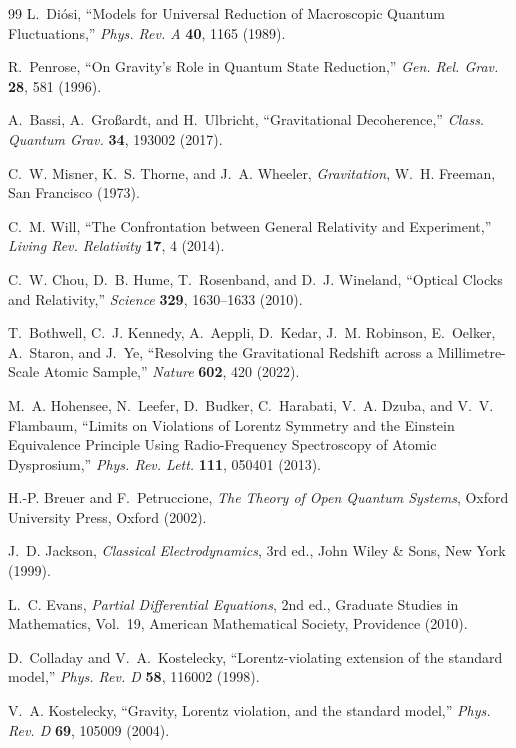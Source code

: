 \documentclass[a4paper,fleqn]{cas-dc}
\theoremstyle{thmstyleone}%
\theoremstyle{thmstyletwo}%
\begin{document}
\begin{thebibliography}{99}
L.~Di\'osi,
``Models for Universal Reduction of Macroscopic Quantum
Fluctuations,''
\textit{Phys. Rev. A} \textbf{40}, 1165 (1989).

R.~Penrose,
``On Gravity's Role in Quantum State Reduction,''
\textit{Gen. Rel. Grav.} \textbf{28}, 581 (1996).

A.~Bassi, A.~Gro{\ss}ardt, and H.~Ulbricht,
``Gravitational Decoherence,''
\textit{Class. Quantum Grav.} \textbf{34}, 193002 (2017).

C.~W. Misner, K.~S. Thorne, and J.~A. Wheeler,
\textit{Gravitation},
W.~H. Freeman, San Francisco (1973).

C.~M. Will,
``The Confrontation between General Relativity and
Experiment,''
\textit{Living Rev. Relativity} \textbf{17}, 4 (2014).

C.~W. Chou, D.~B. Hume, T.~Rosenband, and D.~J. Wineland,
``Optical Clocks and Relativity,''
\textit{Science} \textbf{329}, 1630--1633 (2010).

T.~Bothwell, C.~J. Kennedy, A.~Aeppli, D.~Kedar, J.~M.
Robinson, E.~Oelker, A.~Staron, and J.~Ye,
``Resolving the Gravitational Redshift across a
Millimetre-Scale Atomic Sample,''
\textit{Nature} \textbf{602}, 420 (2022).

M.~A. Hohensee, N.~Leefer, D.~Budker, C.~Harabati, V.~A.
Dzuba, and V.~V. Flambaum,
``Limits on Violations of Lorentz Symmetry and the Einstein
Equivalence Principle Using Radio-Frequency Spectroscopy of
Atomic Dysprosium,''
\textit{Phys. Rev. Lett.} \textbf{111}, 050401 (2013).

H.-P. Breuer and F.~Petruccione,
\textit{The Theory of Open Quantum Systems},
Oxford University Press, Oxford (2002).

J.~D. Jackson,
\textit{Classical Electrodynamics}, 3rd ed.,
John Wiley \& Sons, New York (1999).

L.~C. Evans,
\textit{Partial Differential Equations}, 2nd ed.,
Graduate Studies in Mathematics, Vol.~19,
American Mathematical Society, Providence (2010).

D.~Colladay and V.~A.~Kostelecky,
``Lorentz-violating extension of the standard model,''
\textit{Phys. Rev. D} \textbf{58}, 116002 (1998).

V.~A. Kostelecky,
``Gravity, Lorentz violation, and the standard model,''
\textit{Phys. Rev. D} \textbf{69}, 105009 (2004).


\end{thebibliography}
\end{document}

